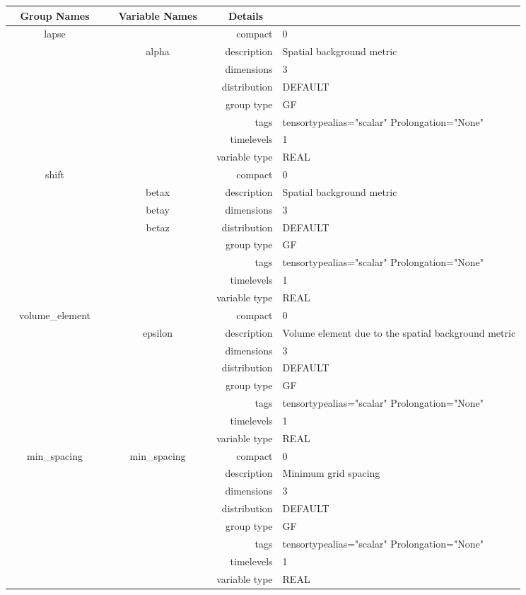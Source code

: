 \documentclass{article}
\begin{document}
\begin{tabular*}{150mm}{|c|c@{\extracolsep{\fill}}|rl|} \hline 
~ {\bf Group Names} ~ & ~ {\bf Variable Names} ~  &{\bf Details} ~ & ~ \\ 
\hline 
lapse &  & compact & 0 \\ 
 & alpha & description & Spatial background metric \\ 
 &  & dimensions & 3 \\ 
 &  & distribution & DEFAULT \\ 
 &  & group type & GF \\ 
 &  & tags & tensortypealias="scalar" Prolongation="None" \\ 
 &  & timelevels & 1 \\ 
 &  & variable type & REAL \\ 
\hline 
shift &  & compact & 0 \\ 
 & betax & description & Spatial background metric \\ 
 & betay & dimensions & 3 \\ 
 & betaz & distribution & DEFAULT \\ 
 &  & group type & GF \\ 
 &  & tags & tensortypealias="scalar" Prolongation="None" \\ 
 &  & timelevels & 1 \\ 
 &  & variable type & REAL \\ 
\hline 
volume\_element &  & compact & 0 \\ 
 & epsilon & description & Volume element due to the spatial background metric \\ 
 &  & dimensions & 3 \\ 
 &  & distribution & DEFAULT \\ 
 &  & group type & GF \\ 
 &  & tags & tensortypealias="scalar" Prolongation="None" \\ 
 &  & timelevels & 1 \\ 
 &  & variable type & REAL \\ 
\hline 
min\_spacing & min\_spacing & compact & 0 \\ 
 &  & description & Minimum grid spacing \\ 
 &  & dimensions & 3 \\ 
 &  & distribution & DEFAULT \\ 
 &  & group type & GF \\ 
 &  & tags & tensortypealias="scalar" Prolongation="None" \\ 
 &  & timelevels & 1 \\ 
 &  & variable type & REAL \\ 
\hline 
\end{tabular*} 
\end{document}
